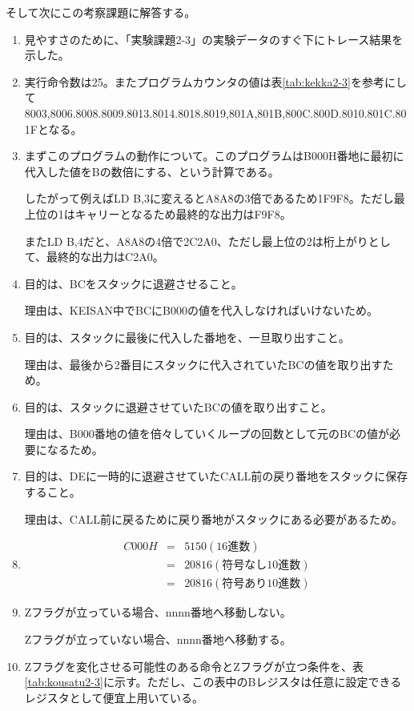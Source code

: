 \documentclass[11pt,a4j]{jsarticle}
\begin{document}
   そして次にこの考察課題に解答する。
   \begin{enumerate}
   \item 見やすさのために、「実験課題2-3」の実験データのすぐ下にトレース結果を示した。
   \item 実行命令数は25。またプログラムカウンタの値は表\ref{tab:kekka2-3}を参考にして8003,8006.8008.8009.8013.8014.8018.8019,801A,801B,800C.800D.8010.801C.801Fとなる。
   \item まずこのプログラムの動作について。このプログラムはB000H番地に最初に代入した値をBの数倍にする、という計算である。
   
   したがって例えばLD B,3に変えるとA8A8の3倍であるため1F9F8。ただし最上位の1はキャリーとなるため最終的な出力はF9F8。
   
   またLD B,4だと、A8A8の4倍で2C2A0、ただし最上位の2は桁上がりとして、最終的な出力はC2A0。
   \item 目的は、BCをスタックに退避させること。
   
   理由は、KEISAN中でBCにB000の値を代入しなければいけないため。
   \item 目的は、スタックに最後に代入した番地を、一旦取り出すこと。
   
   理由は、最後から2番目にスタックに代入されていたBCの値を取り出すため。
   \item 目的は、スタックに退避させていたBCの値を取り出すこと。
   
   理由は、B000番地の値を倍々していくループの回数として元のBCの値が必要になるため。
   \item 目的は、DEに一時的に退避させていたCALL前の戻り番地をスタックに保存すること。
   
   理由は、CALL前に戻るために戻り番地がスタックにある必要があるため。
   \item 
   
   \begin{eqnarray}
   C000H &=& 5150 (16進数) \nonumber \\
                 &=& 20816 (符号なし10進数) \nonumber \\
                 &=& 20816 (符号あり10進数) \nonumber
   \end{eqnarray}
   
   \item Zフラグが立っている場合、nnnn番地へ移動しない。
   
   Zフラグが立っていない場合、nnnn番地へ移動する。
   \item 
   Zフラグを変化させる可能性のある命令とZフラグが立つ条件を、表\ref{tab:kousatu2-3}に示す。ただし、この表中のBレジスタは任意に設定できるレジスタとして便宜上用いている。
   

\end{enumerate}
\end{document}
